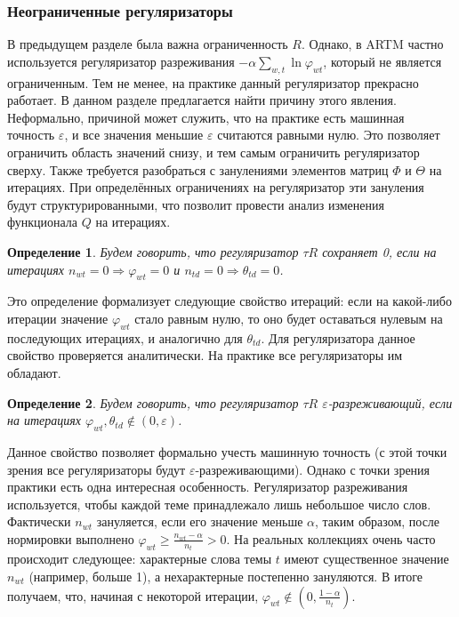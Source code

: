 \documentclass[12pt]{article}
\newtheorem{definition}{Определение}[section]
\renewcommand{\geq}{\geqslant}
\renewcommand{\phi}{\varphi}
\begin{document}
\subsubsection{Неограниченные регуляризаторы}
\label{subsec:unboundreg}
В предыдущем разделе была важна ограниченность $R$. Однако, в ARTM частно используется регуляризатор разреживания $- \alpha \sum_{w,t}\ln \phi_{wt}$, который не является ограниченным. Тем не менее,  на практике данный регуляризатор прекрасно работает. В данном разделе предлагается найти причину этого явления. Неформально, причиной может служить, что на практике есть машинная точность $\varepsilon$, и все значения меньшие $\varepsilon$ считаются равными нулю. Это позволяет ограничить область значений снизу, и тем самым ограничить регуляризатор сверху. Также требуется разобраться с занулениями элементов матриц $\Phi$ и $\Theta$ на итерациях. При определённых  ограничениях на регуляризатор эти зануления будут структурированными, что позволит провести анализ изменения функционала $Q$ на итерациях.
\begin{definition}
Будем говорить, что регуляризатор $\tau R$ сохраняет 0, если на итерациях $n_{wt} = 0 \Rightarrow \phi_{wt} = 0$ и $n_{td} = 0 \Rightarrow \theta_{td} = 0$.
\end{definition}

Это определение формализует следующие свойство итераций: если на какой-либо итерации значение $\phi_{wt}$ стало равным нулю, то оно будет оставаться нулевым на последующих итерациях, и аналогично для $\theta_{td}$. Для регуляризатора данное свойство проверяется аналитически. На практике все регуляризаторы им обладают.
\begin{definition}
\label{sparsereg}
Будем говорить, что регуляризатор $\tau R$ $\varepsilon$-разреживающий, если на итерациях $\phi_{wt}, \theta_{td} \notin (0, \varepsilon)$.
\end{definition}

Данное свойство позволяет формально учесть машинную точность (с этой точки зрения все регуляризаторы будут $\varepsilon$-разреживающими). Однако с точки зрения практики есть одна интересная особенность. Регуляризатор разреживания используется, чтобы каждой теме принадлежало лишь небольшое число слов. Фактически  $n_{wt}$ зануляется, если его значение меньше $\alpha$, таким образом, после нормировки выполнено $\phi_{wt} \geq \frac{n_{wt} - \alpha}{n_t} > 0$.  На реальных коллекциях очень часто происходит следующее: характерные слова темы $t$ имеют существенное значение $n_{wt}$ (например, больше 1), а нехарактерные постепенно зануляются. В итоге получаем, что, начиная с некоторой итерации, $\phi_{wt} \notin (0, \frac{1-\alpha}{n_t})$.
\end{document}
